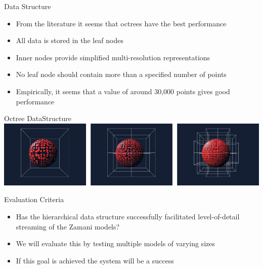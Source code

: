 \documentclass{beamer}
\begin{document}
{\begin{frame}{Data Structure}

\begin{itemize}
\item From the literature it seems that octrees have the best
  performance
\item All data is stored in the leaf nodes
\item Inner nodes provide simplified multi-resolution representations
\item No leaf node should contain more than a specified number of points
\item Empirically, it seems that a value of around 30,000 points gives good performance
\end{itemize}
\end{frame}

\begin{frame}{Octree DataStructure}
\includegraphics[scale=0.35]{oct.png}
\end{frame}


\begin{frame}{Evaluation Criteria}
\begin{itemize}
\item Has the hierarchical data structure successfully facilitated level-of-detail
 streaming of the Zamani models?
\item We will evaluate this by testing multiple models of varying sizes
\item If this goal is achieved the system will be a success
\end{itemize}
\end{frame}
}
\end{document}
